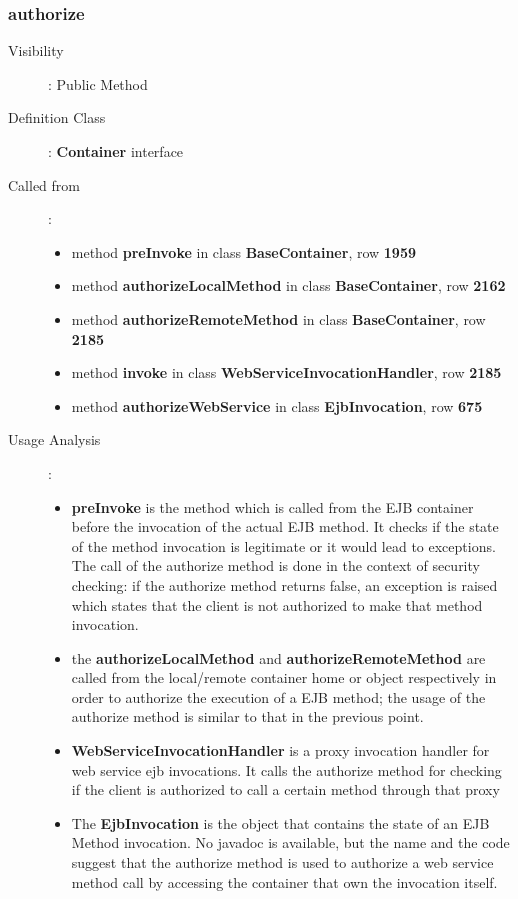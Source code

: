 \documentclass[11pt, a4paper,titlepage]{article}
\begin{document}
	 \subsubsection{authorize}
		 \begin{description}
		 	\item[Visibility]: Public Method
		 	\item[Definition Class]: \textbf{Container} interface
		 	\item[Called from]: 
		 	\begin{itemize}
		 		\item method \textbf{preInvoke} in class \textbf{BaseContainer}, row \textbf{1959}
		 		\item method \textbf{authorizeLocalMethod} in class \textbf{BaseContainer}, row \textbf{2162}
		 		\item method \textbf{authorizeRemoteMethod} in class \textbf{BaseContainer}, row \textbf{2185}
		 		\item method \textbf{invoke} in class \textbf{WebServiceInvocationHandler}, row \textbf{2185} 
		 		\item method \textbf{authorizeWebService} in class \textbf{EjbInvocation}, row \textbf{675}
		 	\end{itemize}
		 	\item[Usage Analysis]: 
		 	\begin{itemize}
		 		\item \textbf{preInvoke} is the method which is called from the EJB container before the invocation of the actual EJB method. It checks if the state of the method invocation is legitimate or it would lead to exceptions. \newline
		 		The call of the authorize method is done in the context of security checking: if the authorize method returns false, an exception is raised which states that the client is not authorized to make that method invocation. 
		 		\item the \textbf{authorizeLocalMethod} and \textbf{authorizeRemoteMethod} are called from the local/remote container home or object respectively in order to authorize the execution of a EJB method; the usage of the authorize method is similar to that in the previous point.
		 		\item \textbf{WebServiceInvocationHandler} is a proxy invocation handler for web service ejb invocations.\newline
		 		It calls the authorize method for checking if the client is authorized to call a certain method through that proxy
		 		\item The \textbf{EjbInvocation} is the object that contains the state of an EJB Method invocation. No javadoc is available, but the name and the code suggest that the authorize method is used to authorize a web service method call by accessing the container that own the invocation itself. 

\end{itemize}
\end{description}
\end{document}
